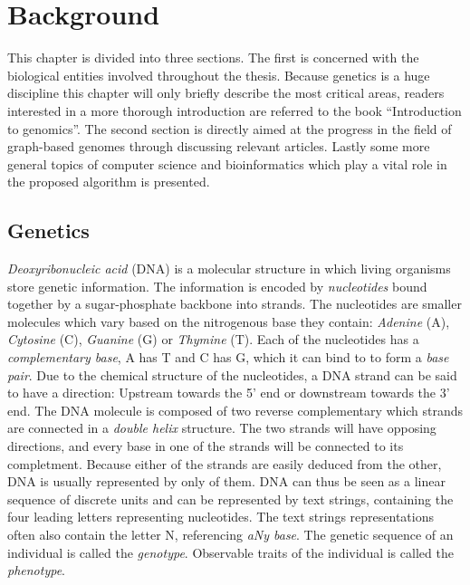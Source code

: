 \documentclass[thesis.tex]{subfiles}
\begin{document}
\chapter{Background}
This chapter is divided into three sections. The first is concerned with the biological entities involved throughout the thesis. Because genetics is a huge discipline this chapter will only briefly describe the most critical areas, readers interested in a more thorough introduction are referred to the book ``Introduction to genomics''\cite{introduction_to_genomics}. The second section is directly aimed at the progress in the field of graph-based genomes through discussing relevant articles. Lastly some more general topics of computer science and bioinformatics which play a vital role in the proposed algorithm is presented.
\section{Genetics}
\textit{Deoxyribonucleic acid} (DNA) is a molecular structure in which living organisms store genetic information. The information is encoded by \textit{nucleotides} bound together by a sugar-phosphate backbone into strands. The nucleotides are smaller molecules which vary based on the nitrogenous base they contain: \textit{Adenine} (A), \textit{Cytosine} (C), \textit{Guanine} (G) or \textit{Thymine} (T). Each of the nucleotides has a \textit{complementary base}, A has T and C has G, which it can bind to to form a \textit{base pair}. Due to the chemical structure of the nucleotides, a DNA strand can be said to have a direction: Upstream towards the 5' end or downstream towards the 3' end. The DNA molecule is composed of two reverse complementary which strands are connected in a \textit{double helix} structure. The two strands will have opposing directions, and every base in one of the strands will be connected to its completment. Because either of the strands are easily deduced from the other, DNA is usually represented by only of them. DNA can thus be seen as a linear sequence of discrete units and can be represented by text strings, containing the four leading letters representing nucleotides. The text strings representations often also contain the letter N, referencing \textit{aNy base}. The genetic sequence of an individual is called the \textit{genotype}. Observable traits of the individual is called the \textit{phenotype}.
\end{document}
